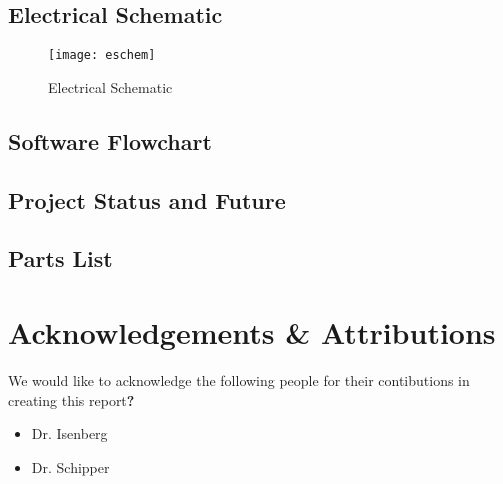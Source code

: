 \subsection{Electrical Schematic}

\begin{figure}[htp]
  \centering
  \texttt{[image: eschem]}
  \caption{Electrical Schematic}
\end{figure}


\newpage
\subsection{Software Flowchart}


% 

\subsection{Project Status and Future}
\newpage
\subsection{Parts List}






% 
% 

\newpage
\section*{Acknowledgements \& Attributions}
We would like to acknowledge the following people for their contibutions in creating this report\textbf{?}
\begin{itemize}
  \item Dr. Isenberg
  \item Dr. Schipper
\end{itemize}
\newpage



